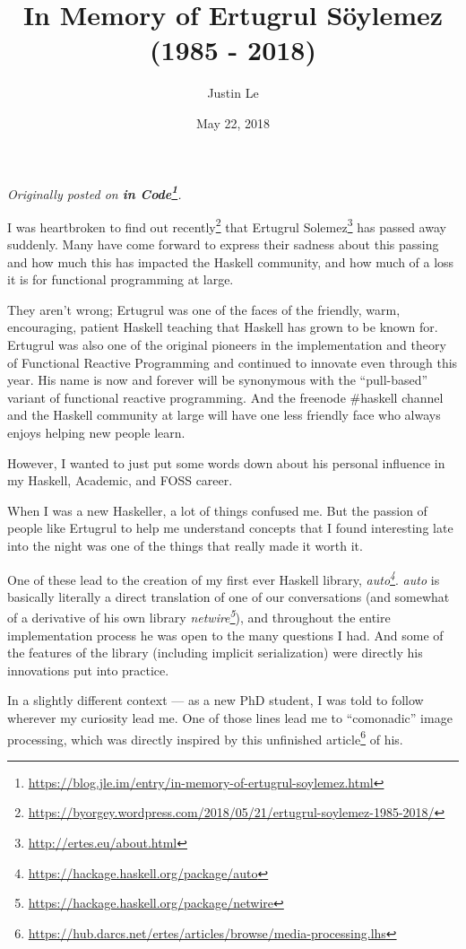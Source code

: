 \documentclass[]{article}
\title{In Memory of Ertugrul Söylemez (1985 - 2018)}
\author{Justin Le}
\date{May 22, 2018}
\renewcommand{\href}[2]{#2\footnote{\url{#1}}}
\begin{document}
\maketitle

\emph{Originally posted on
\textbf{\href{https://blog.jle.im/entry/in-memory-of-ertugrul-soylemez.html}{in
Code}}.}

I was heartbroken to
\href{https://byorgey.wordpress.com/2018/05/21/ertugrul-soylemez-1985-2018/}{find
out recently} that \href{http://ertes.eu/about.html}{Ertugrul Solemez} has
passed away suddenly. Many have come forward to express their sadness about this
passing and how much this has impacted the Haskell community, and how much of a
loss it is for functional programming at large.

They aren't wrong; Ertugrul was one of the faces of the friendly, warm,
encouraging, patient Haskell teaching that Haskell has grown to be known for.
Ertugrul was also one of the original pioneers in the implementation and theory
of Functional Reactive Programming and continued to innovate even through this
year. His name is now and forever will be synonymous with the ``pull-based''
variant of functional reactive programming. And the freenode \#haskell channel
and the Haskell community at large will have one less friendly face who always
enjoys helping new people learn.

However, I wanted to just put some words down about his personal influence in my
Haskell, Academic, and FOSS career.

When I was a new Haskeller, a lot of things confused me. But the passion of
people like Ertugrul to help me understand concepts that I found interesting
late into the night was one of the things that really made it worth it.

One of these lead to the creation of my first ever Haskell library,
\emph{\href{https://hackage.haskell.org/package/auto}{auto}}. \emph{auto} is
basically literally a direct translation of one of our conversations (and
somewhat of a derivative of his own library
\emph{\href{https://hackage.haskell.org/package/netwire}{netwire}}), and
throughout the entire implementation process he was open to the many questions I
had. And some of the features of the library (including implicit serialization)
were directly his innovations put into practice.

In a slightly different context --- as a new PhD student, I was told to follow
wherever my curiosity lead me. One of those lines lead me to ``comonadic'' image
processing, which was directly inspired by
\href{https://hub.darcs.net/ertes/articles/browse/media-processing.lhs}{this
unfinished article} of his.
\end{document}
